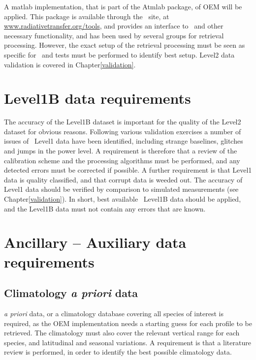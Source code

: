 A matlab implementation, that is part of the Atmlab package, 
of OEM will be applied. This package is available through the \ARTS\ site,
at \url{www.radiativetransfer.org/tools}, and provides an interface
to \ARTS\ and other necessary functionality, and has
been used by several groups for retrieval processing.
However, the exact setup of the retrieval processing
must be seen as specific for \smr\ and tests must be performed
to identify best setup. Level2 data validation 
is covered in Chapter\ref{validation}.


\section{Level1B data requirements}

The accuracy of the Level1B dataset is important for the quality of the
Level2 dataset for obvious reasons. 
Following various validation exercises a number of 
issues of \smr\ Level1 data have been identified, 
including strange baselines, glitches and jumps in the power level.
A requirement is therefore that a review of the calibration 
scheme and the processing algorithms must be performed,
and any detected errors must be corrected if possible. 
A further requirement is that Level1 data is quality classified, 
and that corrupt data is weeded out.
The accuracy of Level1 data should be verified by comparison
to simulated measurements (see Chapter\ref{validation}).
In short,
best available \smr\ Level1B data should be applied,
and the Level1B data must not contain any errors that are known.


\section{Ancillary -- Auxiliary data requirements}
\subsection{Climatology \textit{a priori} data}
\textit{a priori} data, or a climatology database covering all species of interest
is required, as the OEM implementation needs a starting guess for each profile
to be retrieved. 
The climatology must also cover the relevant vertical range for each species, and
latitudinal and seasonal variations.
A requirement is that a literature review is performed,
in order to identify the best possible climatology data.



